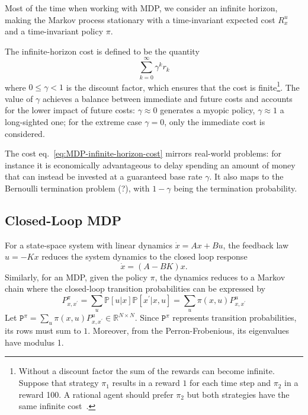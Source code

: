 Most of the time when working with MDP, we consider an infinite horizon, making the Markov process stationary with a time-invariant expected cost $R_x^u$ and a time-invariant policy $\pi$.

The infinite-horizon cost is defined to be the quantity
\begin{equation}
  \label{eq:MDP-infinite-horizon-cost}
  \sum_{k=0}^\infty \gamma^k r_k
\end{equation}
where $0 \le \gamma < 1$ is the discount factor, which ensures that the cost is finite\footnote{Without a discount factor the sum of the rewards can become infinite. Suppose that strategy $\pi_1$ results in a reward $1$ for each time step and $\pi_2$ in a reward 100. A rational agent should prefer $\pi_2$ but both strategies have the same infinite cost~\cite{decision-making-kochenderfer}.}. The value of $\gamma$ achieves a balance between immediate and future costs and accounts for the lower impact of future costs: $\gamma \approx 0$ generates a myopic policy, $\gamma \approx 1$ a long-sighted one; for the extreme case $\gamma = 0$, only the immediate cost is considered.

The cost eq.~\eqref{eq:MDP-infinite-horizon-cost} mirrors real-world problems: for instance it is economically advantageous to delay spending an amount of money that can instead be invested at a guaranteed base rate $\gamma$. It also maps to the Bernoulli termination problem (?), with $1-\gamma$ being the termination probability.

\subsection{Closed-Loop MDP}

For a state-space system with linear dynamics $\dot{x} = Ax+Bu$, the feedback law $u=-Kx$ reduces the system dynamics to the closed loop response
\begin{equation*}
  \dot{x} = (A-BK)x.
\end{equation*}
Similarly, for an MDP, given the policy $\pi$, the dynamics reduces to a Markov chain where the closed-loop transition probabilities can be expressed by
\begin{equation*}
  P^\pi _{x,x^\prime} = \sum_u \mathbb{P}[u|x] \mathbb{P}[x^\prime|x,u] = \sum_u \pi(x,u) P_{x,x^\prime}^u
\end{equation*}
Let $\mathtt{P}^\pi = \sum_u \pi(x,u) P_{x,x^\prime}^u\in \mathbb{R}^{N\times N}$. Since $\mathtt{P}^\pi$ represents transition probabilities, its rows must sum to $1$. Moreover, from the Perron-Frobenious, its eigenvalues have modulus 1.


